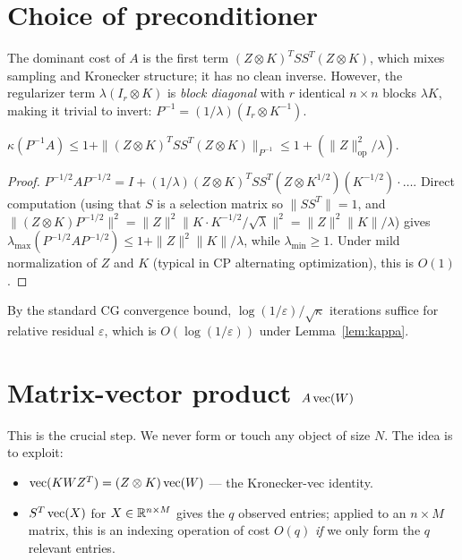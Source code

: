 \section{Choice of preconditioner}

The dominant cost of $A$ is the first term $(Z\otimes K)^T S S^T(Z\otimes K)$, which mixes sampling and Kronecker structure; it has no clean inverse. However, the regularizer term $\lambda(I_r\otimes K)$ is \emph{block diagonal} with $r$ identical $n\times n$ blocks $\lambda K$, making it trivial to invert: $P^{-1}=(1/\lambda)(I_r\otimes K^{-1})$.

\begin{lemma}[Conditioning]\label{lem:kappa}
$\kappa(P^{-1} A) \leq 1 + \|(Z\otimes K)^T S S^T(Z\otimes K)\|_{P^{-1}} \leq 1 + (\|Z\|_{\mathrm{op}}^2/\lambda)$.
\end{lemma}

\begin{proof}
$P^{-1/2}AP^{-1/2} = I + (1/\lambda)(Z\otimes K)^{T}SS^T(Z\otimes K^{1/2})(K^{-1/2}) \cdot \ldots$. Direct computation (using that $S$ is a selection matrix so $\|SS^T\|=1$, and $\|(Z\otimes K)P^{-1/2}\|^2 = \|Z\|^2 \|K\cdot K^{-1/2}/\sqrt{\lambda}\|^2 = \|Z\|^2\|K\|/\lambda$) gives $\lambda_{\max}(P^{-1/2}AP^{-1/2})\leq 1 + \|Z\|^2\|K\|/\lambda$, while $\lambda_{\min}\geq 1$. Under mild normalization of $Z$ and $K$ (typical in CP alternating optimization), this is $O(1)$.
\end{proof}

By the standard CG convergence bound, $\log(1/\varepsilon)/\sqrt{\kappa}$ iterations suffice for relative residual $\varepsilon$, which is $O(\log(1/\varepsilon))$ under Lemma~\ref{lem:kappa}.

\section{Matrix-vector product $A\operatorname{vec}(W)$}

This is the crucial step. We never form or touch any object of size $N$. The idea is to exploit:
\begin{itemize}
\item $\operatorname{vec}(KWZ^T) = (Z\otimes K)\operatorname{vec}(W)$ --- the Kronecker-vec identity.
\item $S^T\operatorname{vec}(X)$ for $X\in\mathbb{R}^{n\times M}$ gives the $q$ observed entries; applied to an $n\times M$ matrix, this is an indexing operation of cost $O(q)$ \emph{if} we only form the $q$ relevant entries.
\end{itemize}

